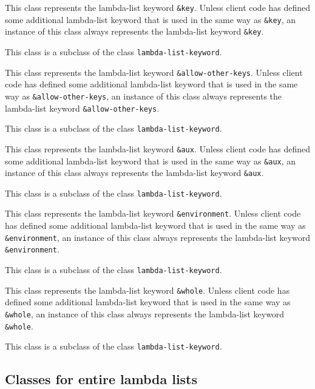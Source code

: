 
This class represents the lambda-list keyword \texttt{\&key}.
Unless client code has defined some additional lambda-list keyword
that is used in the same way as \texttt{\&key}, an instance of
this class always represents the lambda-list keyword
\texttt{\&key}.

This class is a subclass of the class \texttt{lambda-list-keyword}.


This class represents the lambda-list keyword \texttt{\&allow-other-keys}.
Unless client code has defined some additional lambda-list keyword
that is used in the same way as \texttt{\&allow-other-keys}, an instance of
this class always represents the lambda-list keyword
\texttt{\&allow-other-keys}.

This class is a subclass of the class \texttt{lambda-list-keyword}.


This class represents the lambda-list keyword \texttt{\&aux}.
Unless client code has defined some additional lambda-list keyword
that is used in the same way as \texttt{\&aux}, an instance of
this class always represents the lambda-list keyword
\texttt{\&aux}.

This class is a subclass of the class \texttt{lambda-list-keyword}.


This class represents the lambda-list keyword \texttt{\&environment}.
Unless client code has defined some additional lambda-list keyword
that is used in the same way as \texttt{\&environment}, an instance of
this class always represents the lambda-list keyword
\texttt{\&environment}.

This class is a subclass of the class \texttt{lambda-list-keyword}.


This class represents the lambda-list keyword \texttt{\&whole}.
Unless client code has defined some additional lambda-list keyword
that is used in the same way as \texttt{\&whole}, an instance of
this class always represents the lambda-list keyword
\texttt{\&whole}.

This class is a subclass of the class \texttt{lambda-list-keyword}.

\subsection{Classes for entire lambda lists}

